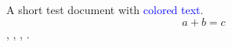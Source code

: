 \documentclass[ letterpaper , twoside ]{article}
\begin{document}
A short test document with \textcolor{blue}{colored text}.
\[
  a + b = c
\]
\the\paperwidth, \the\paperheight, \the\textwidth, \the\textheight.
\end{document}
